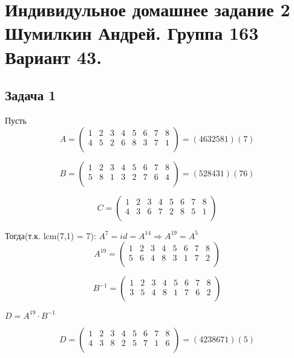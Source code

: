 

	\section{Индивидульное домашнее задание 2 \\ Шумилкин Андрей. Группа 163 \\ Вариант 43. } 
	\subsection{Задача 1} 
	Пусть
	 \[
	 A=
	\begin{pmatrix}
	1 & 2 & 3 & 4 & 5 & 6 & 7 & 8 \\
	4 & 5 & 2 & 6 & 8 & 3 & 7 & 1 \\
	\end{pmatrix} = (4632581)(7)
	\]
	
	 \[
	 B=
	 \begin{pmatrix}
	 1 & 2 & 3 & 4 & 5 & 6 & 7 & 8 \\
	 5 & 8 & 1 & 3 & 2 & 7 & 6 & 4 \\
	 \end{pmatrix} = (528431)(76)
	 \]
	 
	 \[
	 C=
	 \begin{pmatrix}
	 1 & 2 & 3 & 4 & 5 & 6 & 7 & 8 \\
	 4 & 3 & 6 & 7 & 2 & 8 & 5 & 1 \\
	 \end{pmatrix}
	 \]
	 
	 Тогда(т.к. lcm(7,1) = 7): $A^7 = id = A^{14} \Rightarrow A^{19} = A^5$
	  \[
	  A^{19}=
	  \begin{pmatrix}
	  1 & 2 & 3 & 4 & 5 & 6 & 7 & 8 \\
	  5 & 6 & 4 & 8 & 3 & 1 & 7 & 2 \\
	  \end{pmatrix}
	  \]
	 
	  \[
	  B^{-1}=
	  \begin{pmatrix}
	  1 & 2 & 3 & 4 & 5 & 6 & 7 & 8 \\
	  3 & 5 & 4 & 8 & 1 & 7 & 6 & 2 \\
	  \end{pmatrix}
	  \]
	  
	  $D = A^{19} \cdot B^{-1}$
	  
	  \[
	  D=
	  \begin{pmatrix}
	  1 & 2 & 3 & 4 & 5 & 6 & 7 & 8 \\
	  4 & 3 & 8 & 2 & 5 & 7 & 1 & 6 \\
	  \end{pmatrix} = (4238671)(5)
	  \]
	  
